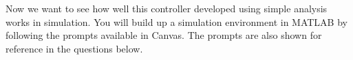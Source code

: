 
Now we want to see how well this controller developed using simple analysis works in simulation. 
 You will build up a simulation environment in MATLAB by following the
 \GRno{} prompts available in Canvas. The prompts are also shown for reference in the questions below.

\vspace*{1cm}

